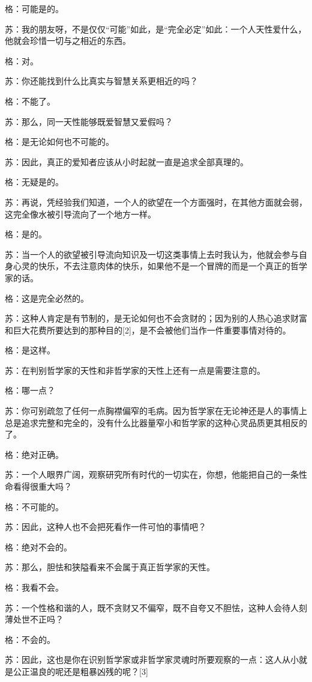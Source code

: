 \documentclass[12pt,oneside]{book}
\begin{document}
格：可能是的。

苏：我的朋友呀，不是仅仅“可能”如此，是“完全必定”如此：一个人天性爱什么，他就会珍惜一切与之相近的东西。

格：对。

苏：你还能找到什么比真实与智慧关系更相近的吗？

格：不能了。

苏：那么，同一天性能够既爱智慧又爱假吗？

格：是无论如何也不可能的。

苏：因此，真正的爱知者应该从小时起就一直是追求全部真理的。

格：无疑是的。

苏：再说，凭经验我们知道，一个人的欲望在一个方面强时，在其他方面就会弱，这完全像水被引导流向了一个地方一样。

格：是的。

苏：当一个人的欲望被引导流向知识及一切这类事情上去时我认为，他就会参与自身心灵的快乐，不去注意肉体的快乐，如果他不是一个冒牌的而是一个真正的哲学家的话。

格：这是完全必然的。

苏：这种人肯定是有节制的，是无论如何也不会贪财的；因为别的人热心追求财富和巨大花费所要达到的那种目的[2]，是不会被他们当作一件重要事情对待的。

格：是这样。

苏：在判别哲学家的天性和非哲学家的天性上还有一点是需要注意的。

格：哪一点？

苏：你可别疏忽了任何一点胸襟偏窄的毛病。因为哲学家在无论神还是人的事情上总是追求完整和完全的，没有什么比器量窄小和哲学家的这种心灵品质更其相反的了。

格：绝对正确。

苏：一个人眼界广阔，观察研究所有时代的一切实在，你想，他能把自己的一条性命看得很重大吗？

格：不可能的。

苏：因此，这种人也不会把死看作一件可怕的事情吧？

格：绝对不会的。

苏：那么，胆怯和狭隘看来不会属于真正哲学家的天性。

格：我看不会。

苏：一个性格和谐的人，既不贪财又不偏窄，既不自夸又不胆怯，这种人会待人刻薄处世不正吗？

格：不会的。

苏：因此，这也是你在识别哲学家或非哲学家灵魂时所要观察的一点：这人从小就是公正温良的呢还是粗暴凶残的呢？[3]
\end{document}
